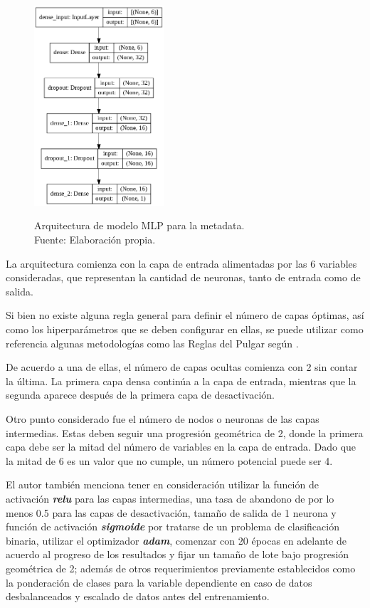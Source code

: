\begin{figure}[!ht]
	\begin{center}
		\includegraphics[width=0.43\textwidth]{4/figures/model_mlp_metadata.png}
		\caption[Arquitectura de modelo MLP para la metadata]{Arquitectura de modelo MLP para la metadata.\\
			Fuente: Elaboración propia.}
		\vspace{-0.5cm}
		\label{4:fig34}
	\end{center}
\end{figure}

La arquitectura comienza con la capa de entrada alimentadas por las 6 variables consideradas, que representan la cantidad de neuronas, tanto de entrada como de salida.

Si bien no existe alguna regla general para definir el número de capas óptimas, así como los hiperparámetros que se deben configurar en ellas, se puede utilizar como referencia algunas metodologías como las Reglas del Pulgar según \cite{tec_ranjan2019thumbrules}.

De acuerdo a una de ellas, el número de capas ocultas comienza con 2 sin contar la última. La primera capa densa continúa a la capa de entrada, mientras que la segunda aparece después de la primera capa de desactivación.

Otro punto considerado fue el número de nodos o neuronas de las capas intermedias. Estas deben seguir una progresión geométrica de 2, donde la primera capa debe ser la mitad del número de variables en la capa de entrada. Dado que la mitad de 6 es un valor que no cumple, un número potencial puede ser 4.

El autor también menciona tener en consideración utilizar la función de activación \textit{\textbf{relu}} para las capas intermedias, una tasa de abandono de por lo menos 0.5 para las capas de desactivación, tamaño de salida de 1 neurona y función de activación \textit{\textbf{sigmoide}} por tratarse de un problema de clasificación binaria, utilizar el optimizador \textit{\textbf{adam}}, comenzar con 20 épocas en adelante de acuerdo al progreso de los resultados y fijar un tamaño de lote bajo progresión geométrica de 2; además de otros requerimientos previamente establecidos como la ponderación de clases para la variable dependiente en caso de datos desbalanceados y escalado de datos antes del entrenamiento.

